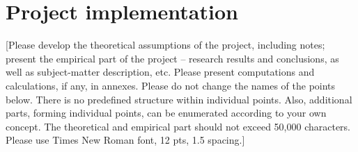 %
%
%


\section{Project implementation}\label{sec:project-implementation}
[Please develop the theoretical assumptions of the project, including notes; present the empirical part of the project – research results and conclusions, as well as subject-matter description, etc.
Please present computations and calculations, if any, in annexes.
Please do not change the names of the points below.
There is no predefined structure within individual points.
Also, additional parts, forming individual points, can be enumerated according to your own concept.
The theoretical and empirical part should not exceed 50,000 characters.
Please use Times New Roman font, 12 pts, 1.5 spacing.] \\

